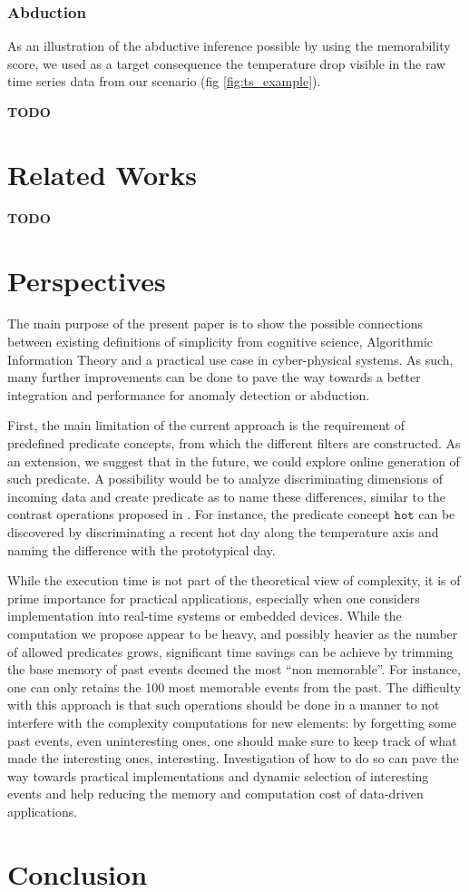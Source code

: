 \documentclass[conference]{IEEEtran}
\begin{document}
\subsubsection{Abduction}

As an illustration of the abductive inference possible by using the memorability
score, we used as a target consequence the temperature drop visible in the raw
time series data from our scenario (fig \ref{fig:ts_example}).

\textbf{TODO}

\section{Related Works}
\label{sec:related}
\textbf{TODO}

\section{Perspectives}
\label{sec:future}
The main purpose of the present paper is to show the possible connections
between existing definitions of simplicity from cognitive science, Algorithmic
Information Theory and a practical use case in cyber-physical systems. As such,
many further improvements can be done to pave the way towards a better
integration and performance for anomaly detection or abduction.

First, the main limitation of the current approach is the requirement of
predefined predicate concepts, from which the different filters are constructed.
As an extension, we suggest that in the future, we could explore online
generation of such predicate. A possibility would be to analyze discriminating
dimensions of incoming data and create predicate as to name these differences,
similar to the contrast operations proposed in \cite{dessalles_conceptual_2015,
  gardenfors2004conceptual}. For instance, the predicate concept $\mathtt{hot}$
can be discovered by discriminating a recent hot day along the
temperature axis and naming the difference with the prototypical day.

While the execution time is not part of the theoretical view of complexity, it
is of prime importance for practical applications, especially when one considers
implementation into real-time systems or embedded devices. While the computation
we propose appear to be heavy, and possibly heavier as the number of allowed
predicates grows, significant time savings can be achieve by trimming the base
memory of past events deemed the most ``non memorable''. For instance, one can
only retains the 100 most memorable events from the past. The difficulty with
this approach is that such operations should be done in a manner to not
interfere with the complexity computations for new elements: by forgetting some
past events, even uninteresting ones, one should make sure to keep track of what
made the interesting ones, interesting. Investigation of how to do so can pave
the way towards practical implementations and dynamic selection of interesting
events and help reducing the memory and computation cost of data-driven applications.


\section{Conclusion}




\end{document}
